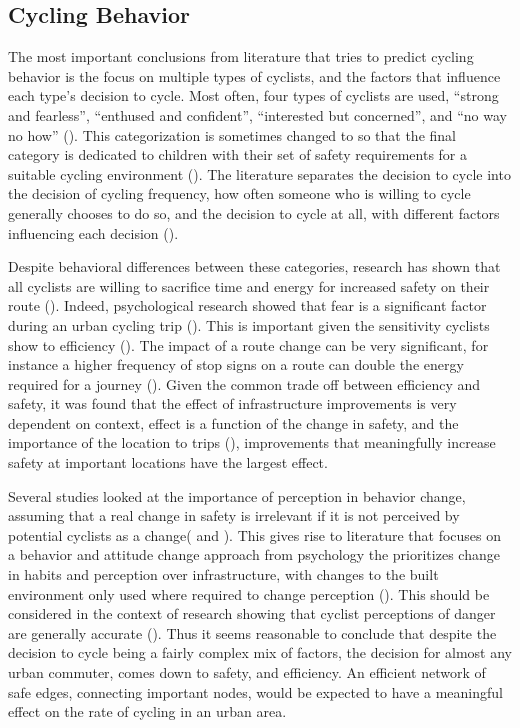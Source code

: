 
\subsection{Cycling Behavior}

The most important conclusions from literature that tries to predict cycling behavior is the focus on multiple types of cyclists, and the factors that influence each type's decision to cycle. Most often, four types of cyclists are used, ``strong and fearless'', ``enthused and confident'', ``interested but concerned'', and ``no way no how'' (\cite{dill2013four}). This categorization is sometimes changed to so that the final category is dedicated to children with their set of safety requirements for a suitable cycling environment (\cite{mekuria2012low}). The literature separates the decision to cycle into the decision of cycling frequency, how often someone who is willing to cycle generally chooses to do so, and the decision to cycle at all, with different factors influencing each decision (\cite{stinson2005comparison}). 

Despite behavioral differences between these categories, research has shown that all cyclists are willing to sacrifice time and energy for increased safety on their route (\cite{winters2011motivators}). Indeed, psychological research showed that fear is a significant factor during an urban cycling trip (\cite{ellett2018state}). This is important given the sensitivity cyclists show to efficiency (\cite{wuerzer2015cycling}). The impact of a route change can be very significant, for instance a higher frequency of stop signs on a route can double the energy required for a journey (\cite{fajans2001bicyclists}). Given the common trade off between efficiency and safety, it was found that the effect of infrastructure improvements is very dependent on context, effect is a function of the change in safety, and the importance of the location to trips (\cite{kondo2018bike}), improvements that meaningfully increase safety at important locations have the largest effect. 

Several studies looked at the importance of perception in behavior change, assuming that a real change in safety is irrelevant if it is not perceived by potential cyclists as a change(\cite{li2012physical} and \cite{parkin2007models}). This gives rise to literature that focuses on a behavior and attitude change approach from psychology the prioritizes change in habits and perception over infrastructure, with changes to the built environment only used where required to change perception (\cite{savan2017integrated}). This should be considered in the context of research showing that cyclist perceptions of danger are generally accurate (\cite{vandenbulcke2014predicting}). Thus it seems reasonable to conclude that despite the decision to cycle being a fairly complex mix of factors, the decision for almost any urban commuter, comes down to safety, and efficiency. An efficient network of safe edges, connecting important nodes, would be expected to have a meaningful effect on the rate of cycling in an urban area.  

